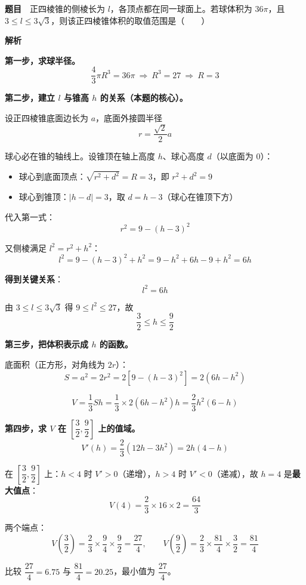 \par\medskip


\textbf{题目}　正四棱锥的侧棱长为 $l$，各顶点都在同一球面上。若球体积为 $36\pi$，且 $3\le l\le3\sqrt3$，则该正四棱锥体积的取值范围是（　　）

\textbf{解析}

\textbf{第一步，求球半径。}
\[\frac43\pi R^{3}=36\pi\ \Longrightarrow\ R^{3}=27\ \Longrightarrow\ R=3\]

\textbf{第二步，建立 $l$ 与锥高 $h$ 的关系（本题的核心）。}

设正四棱锥底面边长为 $a$，底面外接圆半径
\[r=\frac{\sqrt2}2a\]

球心必在锥的轴线上。设锥顶在轴上高度 $h$、球心高度 $d$（以底面为 $0$）：

\begin{itemize}
\item 球心到底面顶点：$\sqrt{r^{2}+d^{2}}=R=3$，即 $r^{2}+d^{2}=9$
\item 球心到锥顶：$|h-d|=3$，取 $d=h-3$（球心在锥顶下方）
\end{itemize}

代入第一式：
\[r^{2}=9-(h-3)^{2}\]

又侧棱满足 $l^{2}=r^{2}+h^{2}$：
\[l^{2}=9-(h-3)^{2}+h^{2}=9-h^{2}+6h-9+h^{2}=6h\]

\textbf{得到关键关系}：
\[\boxed{l^{2}=6h}\]

由 $3\le l\le3\sqrt3$ 得 $9\le l^{2}\le27$，故
\[\frac32\le h\le\frac92\]

\textbf{第三步，把体积表示成 $h$ 的函数。}

底面积（正方形，对角线为 $2r$）：
\[S=a^{2}=2r^{2}=2\left[9-(h-3)^{2}\right]=2\left(6h-h^{2}\right)\]

\[V=\frac13Sh=\frac13\times2\left(6h-h^{2}\right)h=\frac23h^{2}(6-h)\]

\textbf{第四步，求 $V$ 在 $\left[\dfrac32,\dfrac92\right]$ 上的值域。}
\[V'(h)=\frac23\left(12h-3h^{2}\right)=2h(4-h)\]

在 $\left[\dfrac32,\dfrac92\right]$ 上：$h<4$ 时 $V'>0$（递增），$h>4$ 时 $V'<0$（递减），故 $h=4$ 是\textbf{最大值点}：
\[V(4)=\frac23\times16\times2=\frac{64}3\]

两个端点：
\[V\left(\frac32\right)=\frac23\times\frac94\times\frac92=\frac{27}4,\qquad V\left(\frac92\right)=\frac23\times\frac{81}4\times\frac32=\frac{81}4\]

比较 $\dfrac{27}4=6.75$ 与 $\dfrac{81}4=20.25$，最小值为 $\dfrac{27}4$。

